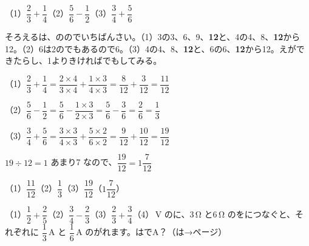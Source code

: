 \begin{reidai}[\R{通分}{つう|ぶん}してたす・ひく]
（1）\nobreak $\dfrac{2}{3}+\dfrac{1}{4}$\qquad（2）\nobreak $\dfrac{5}{6}-\dfrac{1}{2}$\qquad（3）\nobreak $\dfrac{3}{4}+\dfrac{5}{6}$\par
\kangaekata そろえるは、ののでいちばんさい。（1）3の3、6、9、\textbf{12}と、4の4、8、\textbf{12}から12。（2）6は2のでもあるので6。（3）4の4、8、\textbf{12}と、6の6、\textbf{12}から12。えができたらし、1よりきければでもしてみる。\par
\shiki （1）\nobreak $\dfrac{2}{3}+\dfrac{1}{4}=\dfrac{2\times4}{3\times4}+\dfrac{1\times3}{4\times3}=\dfrac{8}{12}+\dfrac{3}{12}=\dfrac{11}{12}$\par
\hspace*{2.6\zw}（2）\nobreak $\dfrac{5}{6}-\dfrac{1}{2}=\dfrac{5}{6}-\dfrac{1\times3}{2\times3}=\dfrac{5}{6}-\dfrac{3}{6}=\dfrac{2}{6}=\dfrac{1}{3}$\par
\hspace*{2.6\zw}（3）\nobreak $\dfrac{3}{4}+\dfrac{5}{6}=\dfrac{3\times3}{4\times3}+\dfrac{5\times2}{6\times2}=\dfrac{9}{12}+\dfrac{10}{12}=\dfrac{19}{12}$\par
\hspace*{2.6\zw}\phantom{（3）}$19\div12=1$ あまり7 なので、$\dfrac{19}{12}=1\dfrac{7}{12}$\par
\kotae （1）\nobreak $\dfrac{11}{12}$\hspace{2\zw}（2）\nobreak $\dfrac{1}{3}$\hspace{2\zw}（3）\nobreak $\dfrac{19}{12}$（$1\dfrac{7}{12}$）
\end{reidai}

\begin{jibun}
（1）\nobreak $\dfrac{1}{2}+\dfrac{2}{5}$\quad（2）\nobreak $\dfrac{3}{4}-\dfrac{2}{3}$\quad（3）\nobreak $\dfrac{2}{3}+\dfrac{3}{4}$\quad（4）\,V のに、3\,Ω と6\,Ω のをにつなぐと、それぞれに $\dfrac{1}{3}$\,A と $\dfrac{1}{6}$\,A のがれます。はで\mbox{A？}（は→\pageref{bk:2-4:heiretsu}ページ）
\end{jibun}

